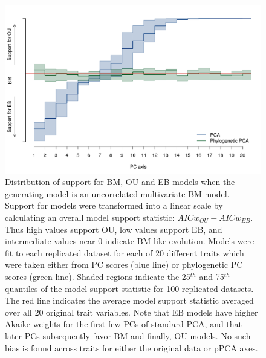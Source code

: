 \documentclass[a4paper,11pt]{article}
\begin{document}
\renewcommand\thefigure{S\arabic{figure}}
\renewcommand\thetable{S \arabic{table}}
\setcounter{figure}{0}    
\setcounter{table}{0}

\begin{figure}[p]
\centering
\includegraphics[scale=0.65]{./fig/uncor-bm-aic.pdf}
\caption{Distribution of support for BM, OU and EB models when the generating model is an uncorrelated multivariate BM model. Support for models were transformed into a linear scale by calculating an overall model support statistic: $AICw_{OU} - AICw_{EB}$. Thus high values support OU, low values support EB, and intermediate values near 0 indicate BM-like evolution. Models were fit to each replicated dataset for each of 20 different traits which were taken either from PC scores (blue line) or phylogenetic PC scores (green line). Shaded regions indicate the  25$^{th}$ and 75$^{th}$ quantiles of the model support statistic for  100 replicated datasets. The red  line indicates the average model support statistic averaged over all 20 original trait variables. Note that EB models have higher Akaike weights for the first few PCs of standard PCA, and that later PCs subsequently favor BM and finally, OU models. No such bias is found across traits for either the original data or pPCA axes.}
\label{aicwbm}
\end{figure}
\end{document}
